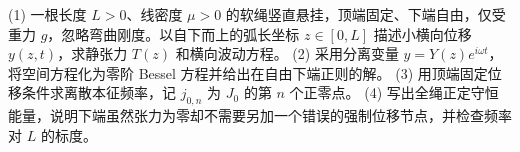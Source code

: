 (1) 一根长度 \(L>0\)、线密度 \(\mu>0\) 的软绳竖直悬挂，顶端固定、下端自由，仅受重力 \(g\)，忽略弯曲刚度。以自下而上的弧长坐标 \(z\in[0,L]\) 描述小横向位移 \(y(z,t)\)，求静张力 \(T(z)\) 和横向波动方程。
(2) 采用分离变量 \(y=Y(z)e^{i\omega t}\)，将空间方程化为零阶 Bessel 方程并给出在自由下端正则的解。
(3) 用顶端固定位移条件求离散本征频率，记 \(j_{0,n}\) 为 \(J_0\) 的第 \(n\) 个正零点。
(4) 写出全绳正定守恒能量，说明下端虽然张力为零却不需要另加一个错误的强制位移节点，并检查频率对 \(L\) 的标度。
